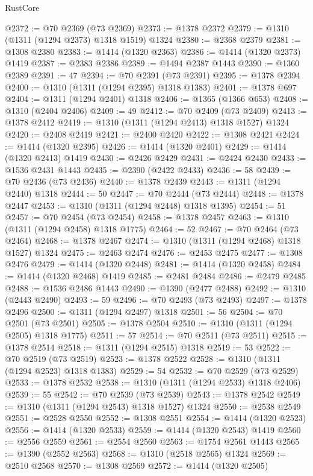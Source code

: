 \begin{lexlean}{RustCore}
\begin{coremodule}
@2372 := @70 @2369 (@73 @2369)
@2373 := @1378 @2372
@2379 := @1310 (@1311 (@1294 @2373) @1318 @1519) @1324
@2380 := @2368 @2379
@2381 := @1308 @2380
@2383 := @1414 (@1320 @2363)
@2386 := @1414 (@1320 @2373) @1419
@2387 := @2383 @2386
@2389 := @1494 @2387 @1443
@2390 := @1360 @2389
@2391 := 47
@2394 := @70 @2391 (@73 @2391)
@2395 := @1378 @2394
@2400 := @1310 (@1311 (@1294 @2395) @1318 @1383)
@2401 := @1378 @697
@2404 := @1311 (@1294 @2401) @1318
@2406 := @1365 (@1366 @653)
@2408 := @1310 (@2404 @2406)
@2409 := 49
@2412 := @70 @2409 (@73 @2409)
@2413 := @1378 @2412
@2419 := @1310 (@1311 (@1294 @2413) @1318 @1527) @1324
@2420 := @2408 @2419
@2421 := @2400 @2420
@2422 := @1308 @2421
@2424 := @1414 (@1320 @2395)
@2426 := @1414 (@1320 @2401)
@2429 := @1414 (@1320 @2413) @1419
@2430 := @2426 @2429
@2431 := @2424 @2430
@2433 := @1536 @2431 @1443
@2435 := @2390 (@2422 @2433)
@2436 := 58
@2439 := @70 @2436 (@73 @2436)
@2440 := @1378 @2439
@2443 := @1311 (@1294 @2440) @1318
@2444 := 50
@2447 := @70 @2444 (@73 @2444)
@2448 := @1378 @2447
@2453 := @1310 (@1311 (@1294 @2448) @1318 @1395)
@2454 := 51
@2457 := @70 @2454 (@73 @2454)
@2458 := @1378 @2457
@2463 := @1310 (@1311 (@1294 @2458) @1318 @1775)
@2464 := 52
@2467 := @70 @2464 (@73 @2464)
@2468 := @1378 @2467
@2474 := @1310 (@1311 (@1294 @2468) @1318 @1527) @1324
@2475 := @2463 @2474
@2476 := @2453 @2475
@2477 := @1308 @2476
@2479 := @1414 (@1320 @2448)
@2481 := @1414 (@1320 @2458)
@2484 := @1414 (@1320 @2468) @1419
@2485 := @2481 @2484
@2486 := @2479 @2485
@2488 := @1536 @2486 @1443
@2490 := @1390 (@2477 @2488)
@2492 := @1310 (@2443 @2490)
@2493 := 59
@2496 := @70 @2493 (@73 @2493)
@2497 := @1378 @2496
@2500 := @1311 (@1294 @2497) @1318
@2501 := 56
@2504 := @70 @2501 (@73 @2501)
@2505 := @1378 @2504
@2510 := @1310 (@1311 (@1294 @2505) @1318 @1775)
@2511 := 57
@2514 := @70 @2511 (@73 @2511)
@2515 := @1378 @2514
@2518 := @1311 (@1294 @2515) @1318
@2519 := 53
@2522 := @70 @2519 (@73 @2519)
@2523 := @1378 @2522
@2528 := @1310 (@1311 (@1294 @2523) @1318 @1383)
@2529 := 54
@2532 := @70 @2529 (@73 @2529)
@2533 := @1378 @2532
@2538 := @1310 (@1311 (@1294 @2533) @1318 @2406)
@2539 := 55
@2542 := @70 @2539 (@73 @2539)
@2543 := @1378 @2542
@2549 := @1310 (@1311 (@1294 @2543) @1318 @1527) @1324
@2550 := @2538 @2549
@2551 := @2528 @2550
@2552 := @1308 @2551
@2554 := @1414 (@1320 @2523)
@2556 := @1414 (@1320 @2533)
@2559 := @1414 (@1320 @2543) @1419
@2560 := @2556 @2559
@2561 := @2554 @2560
@2563 := @1754 @2561 @1443
@2565 := @1390 (@2552 @2563)
@2568 := @1310 (@2518 @2565) @1324
@2569 := @2510 @2568
@2570 := @1308 @2569
@2572 := @1414 (@1320 @2505)

\end{coremodule}
\end{lexlean}
